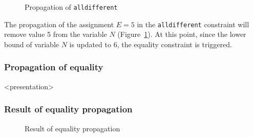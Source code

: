 \begin{figure}[ht]
\caption{\label{sendmore:alldifferentprop3}Propagation of \texttt{alldifferent}}
\begin{center}

\end{center}
\end{figure}


The propagation of the assignment $E=5$ in the \texttt{alldifferent} constraint will remove value 5 from the variable $N$ (Figure~\ref{sendmore:alldifferentprop3}). At this point, since the lower bound of variable $N$ is updated to 6, the equality constraint is triggered.

\begin{frame}
\frametitle{Propagation of equality}
\end{frame}

\begin{frame}<presentation>
\frametitle{Result of equality propagation}
\begin{center}

\end{center}
\end{frame}

\begin{figure}[ht]
\caption{\label{sendmore:equality2}Result of equality propagation}
\begin{center}

\end{center}
\end{figure}


